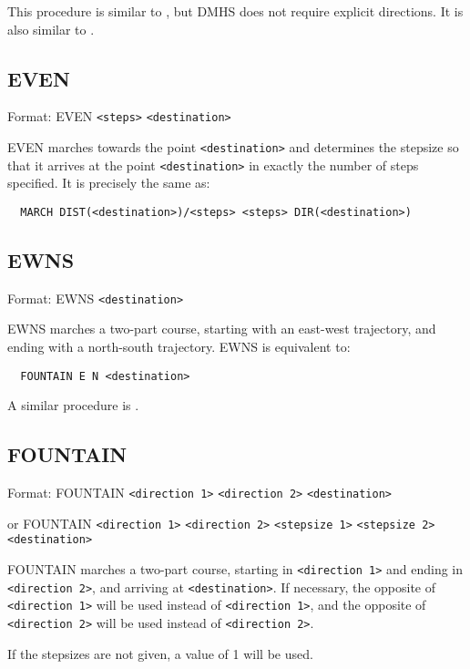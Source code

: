 This procedure is similar to , but DMHS does
not require explicit directions.  It is also similar to .

\subsection{EVEN}\label{even}

Format: EVEN \verb$<steps>$ \verb$<destination>$

EVEN marches towards the point \verb$<destination>$ and determines the
stepsize so that it arrives at the point \verb$<destination>$ in exactly
the number of steps specified.  It is precisely the same as:
\begin{verbatim}
  MARCH DIST(<destination>)/<steps> <steps> DIR(<destination>)
\end{verbatim}

\subsection{EWNS}\label{ewns}

Format: EWNS \verb$<destination>$

EWNS marches a two-part course, starting with an east-west trajectory, and
ending with a north-south trajectory.  EWNS is equivalent to:
\begin{verbatim}
  FOUNTAIN E N <destination>
\end{verbatim}

A similar procedure is .

\subsection{FOUNTAIN}\label{fountain}

Format: FOUNTAIN \verb$<direction 1>$ \verb$<direction 2>$ \verb$<destination>$

or FOUNTAIN \verb$<direction 1>$ \verb$<direction 2>$ \verb$<stepsize 1>$ \verb$<stepsize 2>$ \verb$<destination>$

FOUNTAIN marches a two-part course, starting in \verb$<direction 1>$ and
ending in \verb$<direction 2>$, and arriving at \verb$<destination>$.
If necessary, the opposite of \verb$<direction 1>$ will be used instead
of \verb$<direction 1>$, and the opposite of \verb$<direction 2>$ will
be used instead of \verb$<direction 2>$.

If the stepsizes are not given, a value of 1 will be used.


